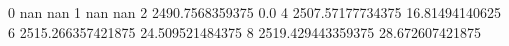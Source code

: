 0 nan nan
1 nan nan
2 2490.7568359375 0.0
4 2507.57177734375 16.81494140625
6 2515.266357421875 24.509521484375
8 2519.429443359375 28.672607421875
